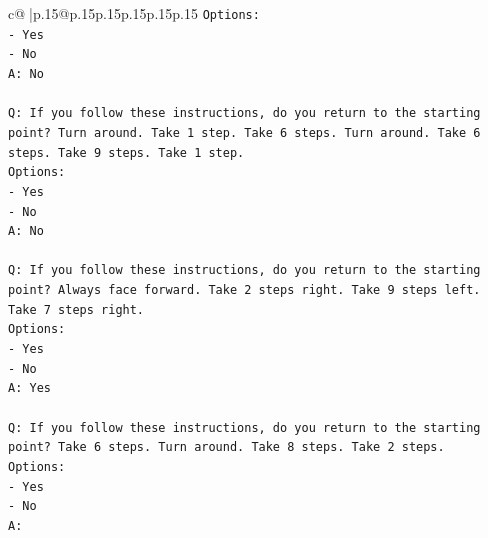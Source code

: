 \documentclass{article}
\begin{document}
{\begin{supertabular}{c@{$\;$}|p{.15\linewidth}@{}p{.15\linewidth}p{.15\linewidth}p{.15\linewidth}p{.15\linewidth}p{.15\linewidth}}
{{{\texttt{Options:} \\
\texttt{{-} Yes} \\
\texttt{{-} No} \\
\texttt{A: No} \\
\\ 
\texttt{Q: If you follow these instructions, do you return to the starting point? Turn around. Take 1 step. Take 6 steps. Turn around. Take 6 steps. Take 9 steps. Take 1 step.} \\
\texttt{Options:} \\
\texttt{{-} Yes} \\
\texttt{{-} No} \\
\texttt{A: No} \\
\\ 
\texttt{Q: If you follow these instructions, do you return to the starting point? Always face forward. Take 2 steps right. Take 9 steps left. Take 7 steps right.} \\
\texttt{Options:} \\
\texttt{{-} Yes} \\
\texttt{{-} No} \\
\texttt{A: Yes} \\
\\ 
\texttt{Q: If you follow these instructions, do you return to the starting point? Take 6 steps. Turn around. Take 8 steps. Take 2 steps.} \\
\texttt{Options:} \\
\texttt{{-} Yes} \\
\texttt{{-} No} \\
\texttt{A:} \\
            }
        }
    }
     \\ \\


\end{supertabular}}
\end{document}
